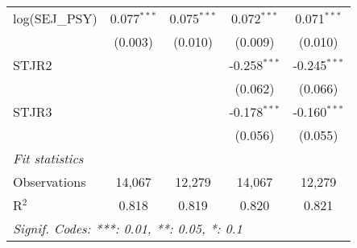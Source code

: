 \begin{tabular}{lcccc}
   log(SEJ\_PSY)      & 0.077$^{***}$ & 0.075$^{***}$ & 0.072$^{***}$  & 0.071$^{***}$\\   
                      & (0.003)       & (0.010)       & (0.009)        & (0.010)\\   
   STJR2              &               &               & -0.258$^{***}$ & -0.245$^{***}$\\   
                      &               &               & (0.062)        & (0.066)\\   
   STJR3              &               &               & -0.178$^{***}$ & -0.160$^{***}$\\   
                      &               &               & (0.056)        & (0.055)\\   
   \midrule
   \emph{Fit statistics}\\
   Observations       & 14,067        & 12,279        & 14,067         & 12,279\\  
   R$^2$              & 0.818         & 0.819         & 0.820          & 0.821\\  
   \midrule \midrule
   \multicolumn{5}{l}{\emph{Signif. Codes: ***: 0.01, **: 0.05, *: 0.1}}\\
\end{tabular}
\par\endgroup



